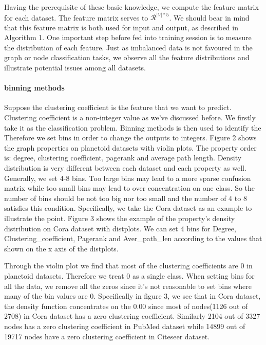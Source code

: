 \documentclass[sigconf]{acmart}
\begin{document}
Having the prerequisite of these basic knowledge, we compute the feature matrix for each dataset. The feature matrix serves to $\mathcal{R}^{|V|*5}$. We should bear in mind that this feature matrix is both used for input and output, as described in Algorithm 1. One important step before fed into training session is to measure the distribution of each feature. Just as imbalanced data is not favoured in the graph or node classification tasks, we observe all the feature distributions and illustrate potential issues among all datasets.


\paragraph{binning methods} Suppose the clustering coefficient is the feature that we want to predict. Clustering coefficient is a non-integer value as we've discussed before. We firstly take it as the classification problem. Binning methods is then used to identify the     Therefore we set bins in order to change the outputs to integers. Figure 2 shows the graph properties on planetoid datasets with violin plots. The property order is: degree, clustering coefficient, pagerank and average path length. Density distribution is very different between each dataset and each property as well. Generally, we set 4-8 bins. Too large bins may lead to a more sparse confusion matrix while too small bins may lead to over concentration on one class. So the number of bins should be not too big nor too small and the number of 4 to 8 satisfies this condition. Specifically, we take the Cora dataset as an example to illustrate the point. Figure 3 shows the example of the property's density distribution on Cora dataset with distplots. We can set 4 bins for Degree, Clustering\_coefficient, Pagerank and Aver\_path\_len according to the values that shown on the x axis of the distplots. 

Through the violin plot we find that most of the clustering coefficients are 0 in planetoid datasets. Therefore we treat 0 as a single class. When setting bins for all the data, we remove all the zeros since it's not reasonable to set bins where many of the bin values are 0. Specifically in figure 3, we see that in Cora dataset, the density function concentrates on the 0.00 since most of nodes(1126 out of 2708) in Cora dataset has a zero clustering coefficient. Similarly 2104 out of 3327 nodes has a zero clustering coefficient in PubMed dataset while 14899 out of 19717 nodes have a zero clustering coefficient in Citeseer dataset.
\end{document}
